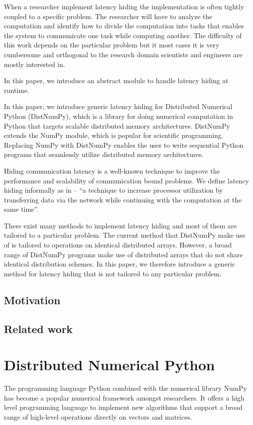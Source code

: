 \documentclass[preprint]{../PGAS10/sigplanconf}
\begin{document}
When a researcher implement latency hiding the implementation is often tightly coupled to a specific problem. The researcher will have to analyze the computation and identify how to divide the computation into tasks that enables the system to communicate one task while computing another. The difficulty of this work depends on the particular problem but it most cases it is very cumbersome and orthogonal to the research domain scientists and engineers are mostly interested in.

In this paper, we introduce an abstract module to handle latency hiding at runtime.



In this paper, we introduce generic latency hiding for Distributed Numerical Python (DistNumPy)\cite{kristensen10_dnumpy}, which is a library for doing numerical computation in Python that targets scalable distributed memory architectures. DistNumPy extends the NumPy module\cite{numpy}, which is popular for scientific programming. Replacing NumPy with DistNumPy enables the user to write sequential Python programs that seamlessly utilize distributed memory architectures.

Hiding communication latency is a well-known technique to improve the performance and scalability of communication bound problems. We define latency hiding informally as in \cite{Strumpen94latencyhiding} -- ``a technique to increase processor utilization by transferring data via the network while continuing with the computation at the same time''.

There exist many methods to implement latency hiding and most of them are tailored to a particular problem. The current method that DistNumPy make use of is tailored to operations on identical distributed arrays. However, a broad range of DistNumPy programs make use of distributed arrays that do not share identical distribution schemes. In this paper, we therefore introduce a generic method for latency hiding that is not tailored to any particular problem.

\subsection{Motivation}
\subsection{Related work}

\section{Distributed Numerical Python}
The programming language Python combined with the numerical library NumPy\cite{numpy} has become a popular numerical framework amongst researchers. It offers a high level programming language to implement new algorithms that support a broad range of high-level operations directly on vectors and matrices.
\end{document}

